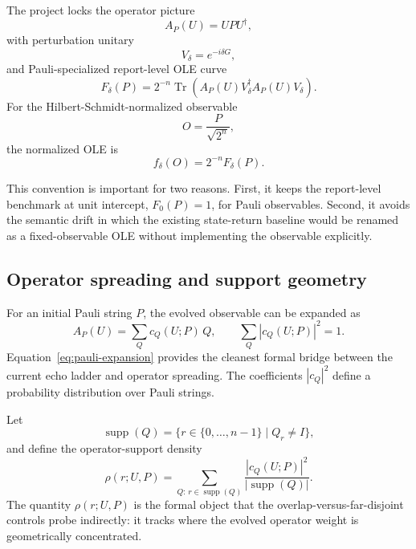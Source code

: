 \documentclass[11pt]{article}
\newcommand{\Tr}{\operatorname{Tr}}
\newcommand{\supp}{\operatorname{supp}}
\begin{document}
The project locks the operator picture
\begin{equation}
A_P(U)=UPU^\dagger,
\end{equation}
with perturbation unitary
\begin{equation}
V_\delta=e^{-i\delta G},
\end{equation}
and Pauli-specialized report-level OLE curve
\begin{equation}
F_\delta(P)=2^{-n}\Tr\!\left(A_P(U)V_\delta^\dagger A_P(U)V_\delta\right).
\label{eq:ole-pauli}
\end{equation}
For the Hilbert-Schmidt-normalized observable
\begin{equation}
O=\frac{P}{\sqrt{2^n}},
\end{equation}
the normalized OLE is
\begin{equation}
f_\delta(O)=2^{-n}F_\delta(P).
\label{eq:ole-normalized}
\end{equation}

This convention is important for two reasons.
First, it keeps the report-level benchmark at unit intercept, $F_0(P)=1$, for Pauli observables.
Second, it avoids the semantic drift in which the existing state-return baseline would be renamed as a fixed-observable OLE without implementing the observable explicitly.

\subsection{Operator spreading and support geometry}

For an initial Pauli string $P$, the evolved observable can be expanded as
\begin{equation}
A_P(U)=\sum_Q c_Q(U;P)\,Q,
\qquad
\sum_Q |c_Q(U;P)|^2 = 1.
\label{eq:pauli-expansion}
\end{equation}
Equation~\eqref{eq:pauli-expansion} provides the cleanest formal bridge between the current echo ladder and operator spreading.
The coefficients $|c_Q|^2$ define a probability distribution over Pauli strings.

Let
\begin{equation}
\supp(Q)=\{r\in\{0,\dots,n-1\}\;|\;Q_r\neq I\},
\end{equation}
and define the operator-support density
\begin{equation}
\rho(r;U,P)
=
\sum_{Q:\,r\in\supp(Q)}
\frac{|c_Q(U;P)|^2}{|\supp(Q)|}.
\label{eq:rho}
\end{equation}
The quantity $\rho(r;U,P)$ is the formal object that the overlap-versus-far-disjoint controls probe indirectly: it tracks where the evolved operator weight is geometrically concentrated.
\end{document}
